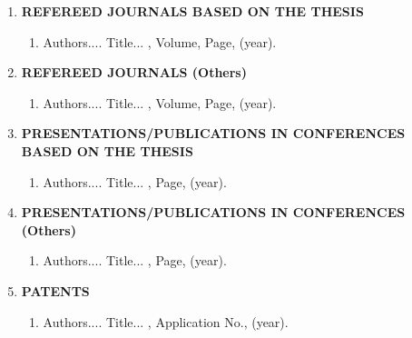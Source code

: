 \listofpapers
\label{lop}
\begin{enumerate}[{I. }]\bfseries
	\item \textbf{REFEREED JOURNALS BASED ON THE THESIS} \\
	 	\begin{enumerate}[{1. }]\normalfont
		\item Authors....  \newblock
		Title...
		, Volume,
		Page, (year).
		\end{enumerate}
	\item \textbf{REFEREED JOURNALS (Others)} \\
		 	\begin{enumerate}[{1. }]\normalfont
		\item Authors....  \newblock
		Title...
		, Volume,
		Page, (year).
		\end{enumerate}
	\item \textbf{PRESENTATIONS/PUBLICATIONS IN CONFERENCES BASED ON THE THESIS} \\
		\begin{enumerate}[{1. }]\normalfont
		\item Authors....  \newblock
		Title...
		,
		Page, (year).
		\end{enumerate}
	\item \textbf{PRESENTATIONS/PUBLICATIONS IN CONFERENCES (Others)} \\
		\begin{enumerate}[{1. }]\normalfont
		\item Authors....  \newblock
		Title...
		,
		Page, (year).
		\end{enumerate}
	\item \textbf{PATENTS} \\
		\begin{enumerate}[{1. }]\normalfont
		\item Authors....  \newblock
		Title...
		,
		Application No., (year).
		\end{enumerate}	
		
\end{enumerate}